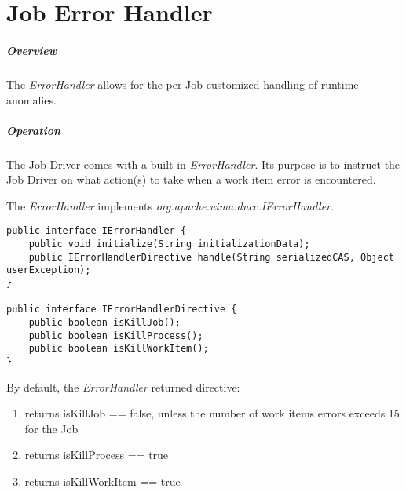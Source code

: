 % 
% 
% 
% 
\ifpdf
\else
{}
\fi
\chapter{Job Error Handler}
\label{chap:job-error-handler}

\paragraph {Overview} The {\em ErrorHandler} allows for the per Job customized handling of runtime anomalies.

\paragraph {Operation} The Job Driver comes with a built-in {\em ErrorHandler}.  Its purpose is to 
instruct the Job Driver on what action(s) to take when a work item error is encountered.

The {\em ErrorHandler} implements {\em org.apache.uima.ducc.IErrorHandler}.

\begin{verbatim}
public interface IErrorHandler {
	public void initialize(String initializationData);
	public IErrorHandlerDirective handle(String serializedCAS, Object userException);
}

public interface IErrorHandlerDirective {
	public boolean isKillJob();
	public boolean isKillProcess();
	public boolean isKillWorkItem();
}
\end{verbatim}

By default, the {\em ErrorHandler} returned directive:
\begin{enumerate}
\item returns isKillJob == false, unless the number of work items errors exceeds 15 for the Job
\item returns isKillProcess == true
\item returns isKillWorkItem == true
\end{enumerate}

